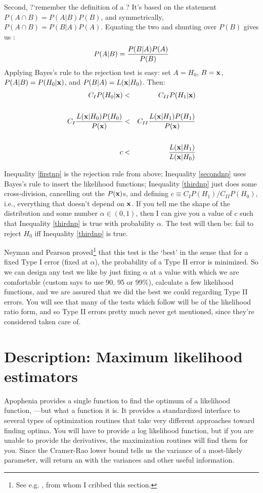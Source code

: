 Second, ?`remember the definition of a ? It's based on the
statement $P(A\cap B)=P(A|B)P(B)$, and symmetrically, $P(A\cap B)=P(B|A)P(A)$.  Equating
the two and shunting over $P(B)$ gives us : $$P(A|B)={P(B|A) P(A)\over P(B)}$$
Applying Bayes's rule to the rejection test is easy: set $A=H_0$, $B={\bf x}$,
$P(A|B)=P(H_0|{\bf x})$, and $P(B|A)=L({\bf x}|H_0)$. Then:
\begin{eqnarray}
C_I P(H_0|{\bf x})&<&C_{II} P(H_1|{\bf x})\label{firstnp}\\
\nonumber\\
C_I {L({\bf x}|H_0)P(H_0)\over P({\bf x})}&<& C_{II} {L({\bf x}|H_1)P(H_1)\over P({\bf x})}\label{secondnp}\\
\nonumber\\
c&<& {L({\bf x}|H_1)\over L({\bf x}|H_0)}\label{thirdnp}
\end{eqnarray}

Inequality \ref{firstnp} is the rejection rule from above; Inequality
\ref{secondnp} uses Bayes's rule to insert the likelihood functions;
Inequality \ref{thirdnp} just does some cross-division, cancelling out the
$P({\bf x})$s, and defining $c\equiv C_IP(H_1)/C_{II}P(H_0)$, i.e., everything
that doesn't depend on ${\bf x}$. If you tell me the shape of the distribution
and some number $\alpha\in(0,1)$, then I can give you a value of $c$
such that Inequality \ref{thirdnp} is true with probability
$\alpha$. The test will then be: fail to reject $H_0$ iff Inequality
\ref{thirdnp} is true.

Neyman and Pearson proved\footnote{See
e.g. \cite[189--191]{amemiya:ez}, from whom I cribbed
this section.}  that this test is the `best' in the sense that for a
fixed Type I error (fixed at $\alpha$), the probability of a Type II
error is minimized. So we can design any test we like by just fixing $\alpha$
at a value with which we are comfortable (custom says to use
90, 95 or 99\%), calculate a few likelihood functions, and we are assured
that we did the best we could regarding Type II errors. You will see that
many of the tests which follow will be of the likelihood ratio form,
and so Type II errors pretty much never get mentioned, since they're
considered taken care of.


\section{Description: Maximum likelihood estimators} 
Apophenia provides a single function to find the optimum of a likelihood
function, ---but what a function it is. It
provides a standardized interface to several types of optimization
routines that take very different approaches toward finding optima. You
will have to provide a log likelihood function, but if you are unable to
provide the derivatives, the maximization routines will find them for
you. Since the Cramer-Rao lower bound tells us the variance of a
most-likely parameter,  will return an
 with the variances and other useful information.

